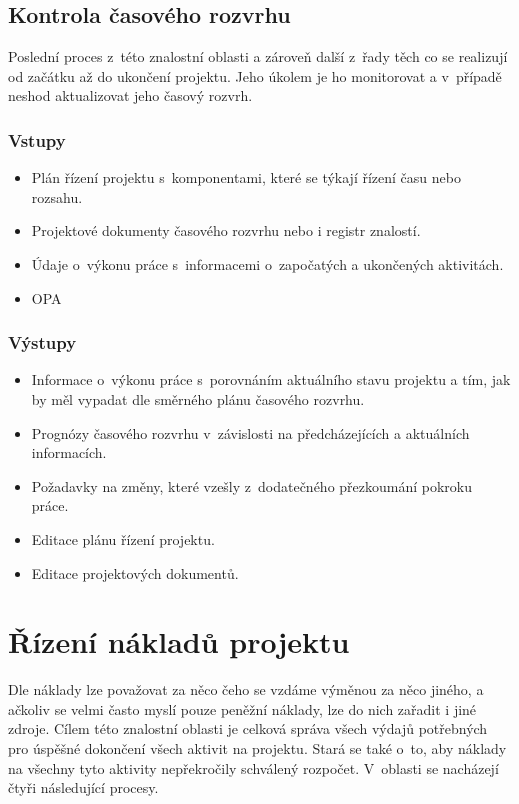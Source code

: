 \subsection*{Kontrola časového rozvrhu}

Poslední proces z~této znalostní oblasti a zároveň další z~řady těch co se realizují od začátku až do ukončení projektu. Jeho úkolem je ho monitorovat a v~případě neshod aktualizovat jeho časový rozvrh. 


\subsubsection*{Vstupy}
\begin{itemize}
    \item Plán řízení projektu s~komponentami, které se týkají řízení času nebo rozsahu.
    \item Projektové dokumenty časového rozvrhu nebo i registr znalostí.
    \item Údaje o~výkonu práce s~informacemi o~započatých a ukončených aktivitách.
    \item OPA
\end{itemize}
\subsubsection*{Výstupy}
\begin{itemize}
    \item Informace o~výkonu práce s~porovnáním aktuálního stavu projektu a tím, jak by měl vypadat dle směrného plánu časového rozvrhu. 
    \item Prognózy časového rozvrhu v~závislosti na předcházejících a aktuálních informacích.
    \item Požadavky na změny, které vzešly z~dodatečného přezkoumání pokroku práce.
    \item Editace plánu řízení projektu.
    \item Editace projektových dokumentů.
\end{itemize}



\section{Řízení nákladů projektu}
\label{RizeniNakladu}

Dle \cite{StrategieRizeni} náklady lze považovat za něco čeho se vzdáme výměnou za něco jiného, a ačkoliv se velmi často myslí pouze peněžní náklady, lze do nich zařadit i jiné zdroje. Cílem této znalostní oblasti je celková správa všech výdajů potřebných pro úspěšné dokončení všech aktivit na projektu. Stará se také o~to, aby náklady na všechny tyto aktivity nepřekročily schválený rozpočet. V~oblasti se nacházejí čtyři následující procesy.

